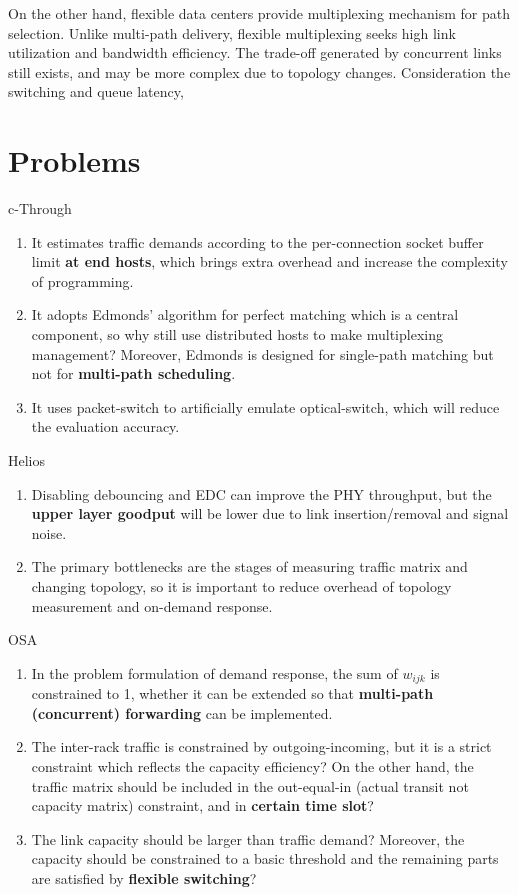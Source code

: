 \documentclass[journal,onecolumn,11pt]{IEEEtran}
\begin{document}
On the other hand, flexible data centers provide multiplexing mechanism for path selection. Unlike multi-path delivery, flexible multiplexing seeks high link utilization and bandwidth efficiency. The trade-off generated by concurrent links still exists, and may be more complex due to topology changes. Consideration the switching and queue latency,

\section{Problems}

\cite{Wang:2010:CPO:1851182.1851222} c-Through
\begin{enumerate}
  \item It estimates traffic demands according to the per-connection socket buffer limit \textbf{at end hosts}, which brings extra overhead and increase the complexity of programming.
  \item It adopts Edmonds' algorithm for perfect matching which is a central component, so why still use distributed hosts to make multiplexing management? Moreover, Edmonds is designed for single-path matching but not for \textbf{multi-path scheduling}.
  \item It uses packet-switch to artificially emulate optical-switch, which will reduce the evaluation accuracy.
\end{enumerate}

\cite{Farrington:2010:HHE:1851182.1851223} Helios
\begin{enumerate}
  \item Disabling debouncing and EDC can improve the PHY throughput, but the \textbf{upper layer goodput} will be lower due to link insertion/removal and signal noise.
  \item The primary bottlenecks are the stages of measuring traffic matrix and changing topology, so it is important to reduce overhead of topology measurement and on-demand response.
\end{enumerate}

\cite{chen2012osa} OSA
\begin{enumerate}
  \item In the problem formulation of demand response, the sum of $w_{ijk}$ is constrained to 1, whether it can be extended so that \textbf{multi-path (concurrent) forwarding} can be implemented.
  \item The inter-rack traffic is constrained by outgoing-incoming, but it is a strict constraint which reflects the capacity efficiency? On the other hand, the traffic matrix should be included in the out-equal-in (actual transit not capacity matrix) constraint, and in \textbf{certain time slot}?
  \item The link capacity should be larger than traffic demand? Moreover, the capacity should be constrained to a basic threshold and the remaining parts are satisfied by \textbf{flexible switching}?
\end{enumerate}
\end{document}
